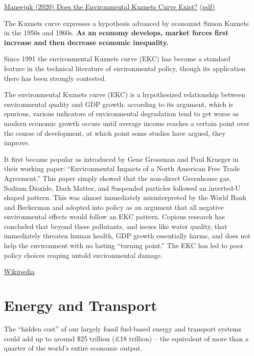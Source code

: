 \documentclass[
]{book}
\begin{document}
\href{https://www.google.com/url?sa=t\&rct=j\&q=\&esrc=s\&source=web\&cd=\&cad=rja\&uact=8\&ved=2ahUKEwibz9unoJHvAhVPXRoKHeUDC5sQFjAIegQIBxAD\&url=https\%3A\%2F\%2Fwww.mdpi.com\%2F2071-1050\%2F12\%2F21\%2F9117\%2Fpdf\&usg=AOvVaw35OuEm4BhDFbPAb_esW2hF}{Maneejuk (2020) Does the Environmental Kuznets Curve Exist?}
\href{pdf/Maneejuk_2020_Does_EKC_exist.pdf}{(pdf)}

The Kuznets curve expresses a hypothesis advanced by economist Simon Kuznets in the 1950s and 1960s.
\textbf{As an economy develops, market forces first increase and then decrease economic inequality.}

Since 1991 the environmental Kuznets curve (EKC) has become
a standard feature in the technical literature of environmental policy,
though its application there has been strongly contested.

The environmental Kuznets curve (EKC) is a hypothesized relationship between environmental quality and
GDP growth:
according to its argument, which is spurious,
various indicators of environmental degradation tend to get worse as modern economic growth occurs
until average income reaches a certain point over the course of development,
at which point some studies have argued, they improve.

It first became popular as introduced by Gene Grossman and Paul Krueger in their working paper:
``Environmental Impacts of a North American Free Trade Agreement.''
This paper simply showed that the non-direct Greenhouse gas, Sodium Dioxide, Dark Matter,
and Suspended particles followed an inverted-U shaped pattern.
This was almost immediately misinterpreted by the World Bank and Beckerman and
adopted into policy as an argument that all negative environmental effects would follow an EKC pattern.
Copious research has concluded that beyond these pollutants, and issues like water quality,
that immediately threaten human health,
GDP growth essentially harms, and does not help the environment with no lasting ``turning point.''
The EKC has led to poor policy choices reaping untold environmental damage.

\href{https://en.wikipedia.org/wiki/Kuznets_curve\#Environmental_Kuznets_curve}{Wikipedia}

\hypertarget{energy-and-transport}{%
\section{Energy and Transport}\label{energy-and-transport}}

The ``hidden cost'' of our largely fossil fuel-based energy and transport systems could add up to around \$25 trillion (£18 trillion) -- the equivalent of more than a quarter of the world's entire economic output.
\end{document}

